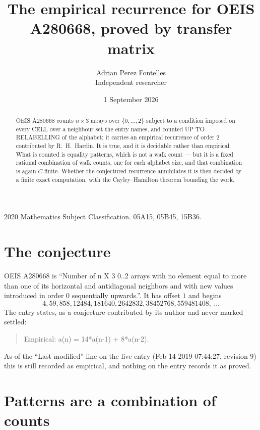 \documentclass[11pt,a4paper]{article}
\title{The empirical recurrence for OEIS A280668, proved by transfer matrix}
\author{Adrian Perez Fontelles\\ \small Independent researcher}
\date{1 September 2026}
\theoremstyle{plain}
\theoremstyle{definition}
\begin{document}
\maketitle

\begin{abstract}
OEIS A280668 counts $n\times3$ arrays over $\{0,\dots,2\}$ subject to a condition imposed on
every CELL over a neighbour set the entry names, and counted UP TO RELABELLING of the
alphabet; it carries an empirical recurrence of order $2$ contributed by
R.~H.~Hardin. It is true, and it is decidable rather than empirical. What is counted is
equality patterns, which is not a walk count --- but it is a fixed rational combination of
walk counts, one for each alphabet size, and that combination is again $C$-finite. Whether the
conjectured recurrence annihilates it is then decided by a finite exact computation, with the
Cayley--Hamilton theorem bounding the work.
\end{abstract}

\noindent\small 2020 Mathematics Subject Classification. 05A15, 05B45, 15B36.\normalsize

\section{The conjecture}

OEIS A280668 is ``Number of n X 3 0..2 arrays with no element equal to more than one of its horizontal and antidiagonal neighbors and with new values introduced in order 0 sequentially upwards.''. It has offset $1$ and begins
\[
4, 59, 858, 12484, 181640, 2642832, 38452768, 559481408,\ \dots
\]
The entry states, as a conjecture contributed by its author and never marked settled:
\begin{quote}
Empirical: a(n) = 14*a(n-1) + 8*a(n-2).
\end{quote}
As of the ``Last modified'' line on the live entry (Feb 14 2019 07:44:27, revision 9) this is still
recorded as empirical, and nothing on the entry records it as proved.

\section{Patterns are a combination of counts}
\end{document}
